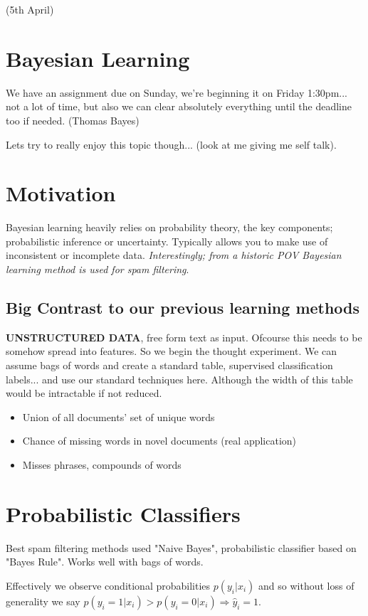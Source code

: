 \documentclass{article}
\begin{document}
(5th April)
\section{Bayesian Learning}
We have an assignment due on Sunday, we're beginning it on Friday 1:30pm... not a lot of time, but also we can clear absolutely everything until the deadline too if needed. (Thomas Bayes)

Lets try to really enjoy this topic though... (look at me giving me self talk).

\section{Motivation}
Bayesian learning heavily relies on probability theory, the key components; probabilistic inference or uncertainty. Typically allows you to make use of inconsistent or incomplete data. {\em Interestingly; from a historic POV Bayesian learning method is used for spam filtering}.

\subsection{Big Contrast to our previous learning methods}
{\bf UNSTRUCTURED DATA}, free form text as input. Ofcourse this needs to be somehow spread into features. So we begin the thought experiment. We can assume bags of words and create a standard table, supervised classification labels... and use our standard techniques here. Although the width of this table would be intractable if not reduced.

\begin{itemize}
	\item Union of all documents' set of unique words
	\item Chance of missing words in novel documents (real application)
	\item Misses phrases, compounds of words
\end{itemize}

\section{Probabilistic Classifiers}
Best spam filtering methods used "Naive Bayes", probabilistic classifier based on "Bayes Rule". Works well with bags of words.
 
Effectively we observe conditional probabilities $p(y_i|x_i)$ and so without loss of generality we say $p(y_i=1|x_i) > p(y_i=0|x_i) \Rightarrow \hat y_i=1$.
\end{document}
